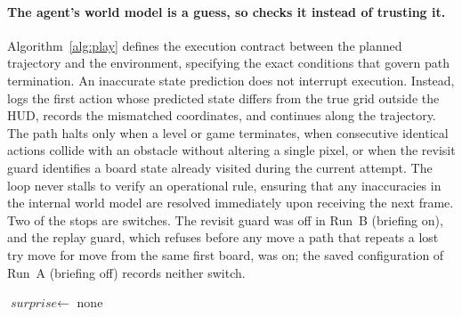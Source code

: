 \paragraph{The agent's world model is a guess, so  checks it instead of trusting it.}
Algorithm~\ref{alg:play} defines the execution contract between the planned trajectory and the environment, specifying the exact conditions that govern path termination. An inaccurate state prediction does not interrupt execution. Instead,  logs the first action whose predicted state differs from the true grid outside the HUD, records the mismatched coordinates, and continues along the trajectory. The path halts only when a level or game terminates, when consecutive identical actions collide with an obstacle without altering a single pixel, or when the revisit guard identifies a board state already visited during the current attempt. The loop never stalls to verify an operational rule, ensuring that any inaccuracies in the internal world model are resolved immediately upon receiving the next frame. Two of the stops are switches. The revisit guard was off in Run~B (briefing on), and the replay guard, which refuses before any move a path that repeats a lost try move for move from the same first board, was on; the saved configuration of Run~A (briefing off) records neither switch.

\begin{algorithm}[!htb]
\caption{\textsc{Play}: sending a planned path and checking the agent's predictions}
\label{alg:play}
$\textit{surprise} \gets$ none\;
\end{algorithm}

